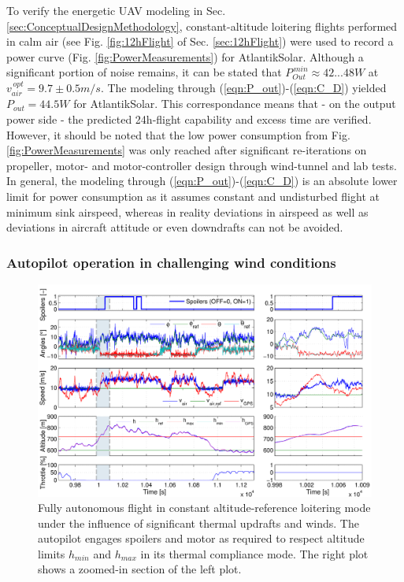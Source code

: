 To verify the energetic UAV modeling in Sec. \ref{sec:ConceptualDesignMethodology}, constant-altitude loitering flights performed in calm air (see Fig. \ref{fig:12hFlight} of Sec. \ref{sec:12hFlight}) were used to record a power curve (Fig. \ref{fig:PowerMeasurements}) for AtlantikSolar. Although a significant portion of noise remains, it can be stated that $P_{Out}^{\,min}\approx42...48W$ at $v_{air}^{\,opt}=9.7\pm0.5m/s$. The modeling through (\ref{eqn:P_out})-(\ref{eqn:C_D}) yielded $P_{out}=44.5W$ for AtlantikSolar. This correspondance means that - on the output power side - the predicted 24h-flight capability and excess time are verified. However, it should be noted that the low power consumption from Fig. \ref{fig:PowerMeasurements} was only reached after significant re-iterations on propeller, motor- and motor-controller design through wind-tunnel and lab tests. In general, the modeling through (\ref{eqn:P_out})-(\ref{eqn:C_D}) is an absolute lower limit for power consumption as it assumes constant and undisturbed flight at minimum sink airspeed, whereas in reality deviations in airspeed as well as deviations in aircraft attitude or even downdrafts can not be avoided.

\subsubsection{Autopilot operation in challenging wind conditions}

\begin{figure}[tb]
    \centering
     \includegraphics[width=\linewidth]{images/ControlTestFlight/ControlTestFlight.pdf}
    \caption{Fully autonomous flight in constant altitude-reference loitering mode under the influence of significant thermal updrafts and winds. The autopilot engages spoilers and motor as required to respect altitude limits $h_{min}$ and $h_{max}$ in its thermal compliance mode. The right plot shows a zoomed-in section of the left plot.} 
    \label{fig:ControlTestFlight}
\end{figure}

